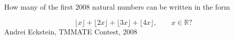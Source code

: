 How many of the first $2008$ natural numbers can be written in the form

\[
    \lfloor x \rfloor + \lfloor 2x \rfloor + \lfloor 3x \rfloor + \lfloor 4x \rfloor,\qquad x \in \mathbb{R}?
  \]Andrei Eckstein, TMMATE Contest, 2008
